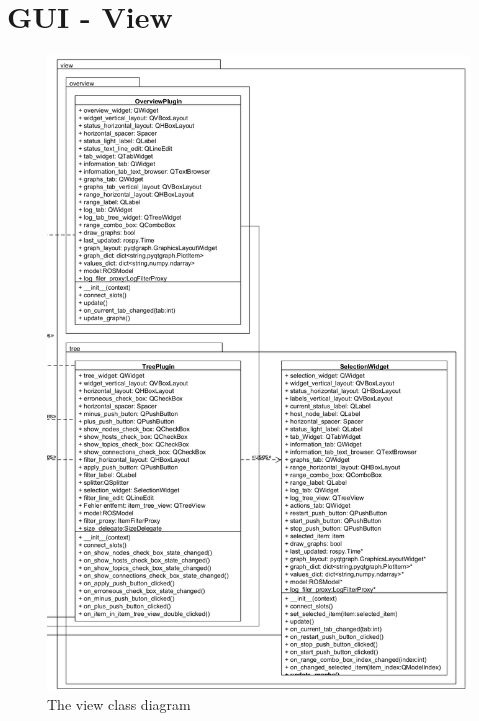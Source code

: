\section{GUI - View}
\begin{figure}[!ht]
\begin{center}
\includegraphics[width=0.8\linewidth]{./diagram_pictures/view.png}
\caption{The view class diagram}
\end{center}
\end{figure}

